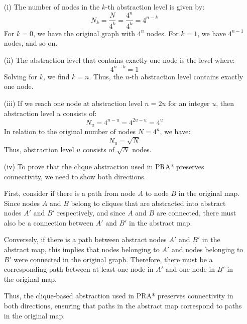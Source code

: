 \documentclass{article}
\begin{document}
\begin{enumerate}
    \item[(i)] The number of nodes in the $k$-th abstraction level is given by:
    \[
    N_k = \frac{N}{4^k} = \frac{4^n}{4^k} = 4^{n-k}
    \]
    For $k = 0$, we have the original graph with $4^n$ nodes. For $k = 1$, we have $4^{n-1}$ nodes, and so on.

    \item[(ii)] The abstraction level that contains exactly one node is the level where:
    \[
    4^{n-k} = 1
    \]
    Solving for $k$, we find $k = n$. Thus, the $n$-th abstraction level contains exactly one node.

    \item[(iii)] If we reach one node at abstraction level $n = 2u$ for an integer $u$, then abstraction level $u$ consists of:
    \[
    N_u = 4^{n-u} = 4^{2u-u} = 4^u
    \]
    In relation to the original number of nodes $N = 4^n$, we have:
    \[
    N_u = \sqrt{N}
    \]
    Thus, abstraction level $u$ consists of $\sqrt{N}$ nodes.

    \item[(iv)] To prove that the clique abstraction used in PRA* preserves connectivity, we need to show both directions.

    First, consider if there is a path from node $A$ to node $B$ in the original map. Since nodes $A$ and $B$ belong to cliques that are abstracted into abstract nodes $A'$ and $B'$ respectively, and since $A$ and $B$ are connected, there must also be a connection between $A'$ and $B'$ in the abstract map.

    Conversely, if there is a path between abstract nodes $A'$ and $B'$ in the abstract map, this implies that nodes belonging to $A'$ and nodes belonging to $B'$ were connected in the original graph. Therefore, there must be a corresponding path between at least one node in $A'$ and one node in $B'$ in the original map.
    
    Thus, the clique-based abstraction used in PRA* preserves connectivity in both directions, ensuring that paths in the abstract map correspond to paths in the original map.
\end{enumerate}
\end{document}

